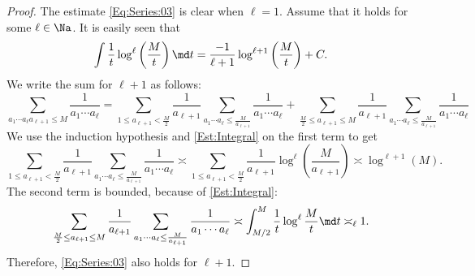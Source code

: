 \documentclass[12pt,a4paper]{amsart}
\begin{document}
\begin{proof}
The estimate \eqref{Eq:Series:03} is clear when $\ell=1$. Assume that it holds for some $\ell\in\Na$. It is easily seen that 
\begin{equation}\label{Est:Integral}
\int \frac{1}{t} \log^{\ell}\left( \frac{M}{t}\right) \md t
= 
\frac{-1}{\ell+1} \log^{\ell+1}\left( \frac{M}{t}\right) + C.
\end{equation}
We write the sum for $\ell+1$ as follows:
\[
\sum_{a_1\cdots a_{\ell}a_{\ell+1}\leq M} \frac{1}{a_1\cdots a_{\ell}} 
=
\sum_{1\leq a_{\ell+1}< \frac{M}{2}} \frac{1}{a_{\ell+1}} \sum_{a_1\cdots a_{\ell}\leq \frac{M}{a_{\ell+1}}} \frac{1}{a_1\cdots a_{\ell}} 
+
\sum_{\frac{M}{2} \leq a_{\ell+1}\leq M} \frac{1}{a_{\ell+1}} \sum_{a_1\cdots a_{\ell}\leq \frac{M}{a_{\ell+1}}} \frac{1}{a_1\cdots a_{\ell}} 
\]
We use the induction hypothesis and \eqref{Est:Integral} on the first term to get
\[
\sum_{1\leq a_{\ell+1}< \frac{M}{2}} \frac{1}{a_{\ell+1}} \sum_{a_1\cdots a_{\ell}\leq \frac{M}{a_{\ell+1}}} \frac{1}{a_1\cdots a_{\ell}} 
\asymp
\sum_{1\leq a_{\ell+1}< \frac{M}{2}} \frac{1}{a_{\ell+1}} \log^{\ell}\left( \frac{M}{a_{\ell+1}}\right)
\asymp
\log^{\ell+1}(M).
\]
The second term is bounded, because of \eqref{Est:Integral}:
\[
\sum_{\frac{M}{2} \leq a_{\ell+1}\leq M} \frac{1}{a_{\ell+1}} \sum_{a_1\cdots a_{\ell}\leq \frac{M}{a_{\ell+1}}} \frac{1}{a_1\cdots a_{\ell}} 
\asymp 
\int_{M/2}^M \frac{1}{t}\log^{\ell}\frac{M}{t} \md t
\asymp_{\ell}
1.
\]
Therefore, \eqref{Eq:Series:03} also holds for $\ell+1$.


\end{proof}
\end{document}
